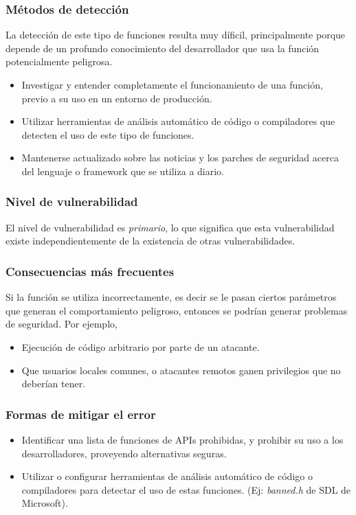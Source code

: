 \subsubsection{Métodos de detección}
La detección de este tipo de funciones resulta muy díficil, principalmente porque depende de un profundo conocimiento del desarrollador que usa la función potencialmente peligrosa.

\begin{itemize}
    \item Investigar y entender completamente el funcionamiento de una función, previo a su uso en un entorno de producción.
    \item Utilizar herramientas de análisis automático de código o compiladores que detecten el uso de este tipo de funciones.
    \item Mantenerse actualizado sobre las noticias y los parches de seguridad acerca del lenguaje o framework que se utiliza a diario.
\end{itemize}

\subsubsection{Nivel de vulnerabilidad}

El nivel de vulnerabilidad es \textit{primario}, lo que significa que esta vulnerabilidad existe independientemente de la existencia de otras vulnerabilidades.


\subsubsection{Consecuencias más frecuentes}

Si la función se utiliza incorrectamente, es decir se le pasan ciertos parámetros que generan el comportamiento peligroso, entonces se podrían generar problemas de seguridad.
Por ejemplo,

\begin{itemize}
    \item Ejecución de código arbitrario por parte de un atacante.
    \item Que usuarios locales comunes, o atacantes remotos ganen privilegios que no deberían tener.
\end{itemize}

\subsubsection{Formas de mitigar el error}
\begin{itemize}
   \item Identificar una lista de funciones de APIs prohibidas, y prohibir su uso a los desarrolladores, proveyendo alternativas seguras.
   \item Utilizar o configurar herramientas de análisis automático de código o compiladores para detectar el uso de estas funciones. (Ej: \textit{banned.h} de SDL de Microsoft).
\end{itemize}

